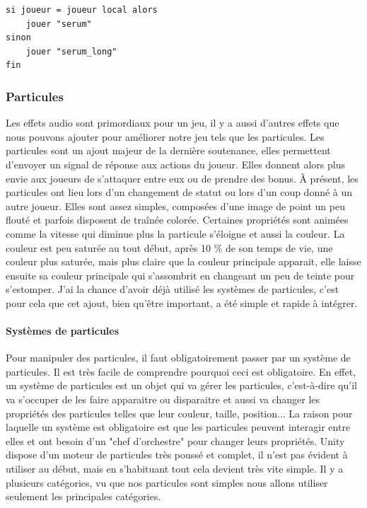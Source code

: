 \documentclass{article}
\begin{document}
\begin{lstlisting}
si joueur = joueur local alors
	jouer "serum"
sinon
	jouer "serum_long"
fin
\end{lstlisting}


\newpage
\subsubsection{Particules}


Les effets audio sont primordiaux pour un jeu, il y a aussi d'autres effets que nous pouvons ajouter pour améliorer notre jeu tels que les particules.
Les particules sont un ajout majeur de la dernière soutenance, elles permettent d'envoyer un signal de réponse aux actions du joueur. Elles donnent alors plus envie aux joueurs de s'attaquer entre eux ou de prendre des bonus.
À présent, les particules ont lieu lors d'un changement de statut ou lors d'un coup donné à un autre joueur. Elles sont assez simples, composées d'une image de point un peu flouté et parfois disposent de traînée colorée. Certaines propriétés sont animées comme la vitesse qui diminue plus la particule s'éloigne et aussi la couleur. La couleur est peu saturée au tout début, après 10 \% de son temps de vie, une couleur plus saturée, mais plus claire que la couleur principale apparait, elle laisse ensuite sa couleur principale qui s'assombrit en changeant un peu de teinte pour s'estomper.
J'ai la chance d'avoir déjà utilisé les systèmes de particules, c'est pour cela que cet ajout, bien qu'être important, a été simple et rapide à intégrer.


\paragraph{Systèmes de particules}


Pour manipuler des particules, il faut obligatoirement passer par un système de particules.
Il est très facile de comprendre pourquoi ceci est obligatoire. En effet, un système de particules est un objet qui va gérer les particules, c'est-à-dire qu'il va s'occuper de les faire apparaitre ou disparaitre et aussi va changer les propriétés des particules telles que leur couleur, taille, position... La raison pour laquelle un système est obligatoire est que les particules peuvent interagir entre elles et ont besoin d'un "chef d'orchestre" pour changer leurs propriétés.
Unity dispose d'un moteur de particules très poussé et complet, il n'est pas évident à utiliser au début, mais en s'habituant tout cela devient très vite simple. Il y a plusieurs catégories, vu que nos particules sont simples nous allons utiliser seulement les principales catégories.
\end{document}
